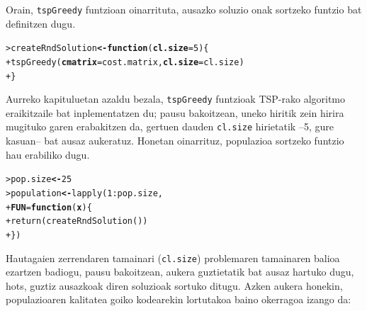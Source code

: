 \documentclass[eu]{ifirak}\usepackage[]{graphicx}\usepackage[]{color}
\makeatletter
\newcommand{\hlnum}[1]{\textcolor[rgb]{0.659,0.4,0.051}{#1}}%
\newcommand{\hlopt}[1]{\textcolor[rgb]{0,0,0}{#1}}%
\newcommand{\hlstd}[1]{\textcolor[rgb]{0,0,0}{#1}}%
\newcommand{\hlkwa}[1]{\textcolor[rgb]{0.133,0.224,0.659}{\textbf{#1}}}%
\newcommand{\hlkwb}[1]{\textcolor[rgb]{0.549,0.114,0.412}{\textbf{#1}}}%
\newcommand{\hlkwc}[1]{\textcolor[rgb]{0.659,0.573,0.133}{\textbf{#1}}}%
\newcommand{\hlkwd}[1]{\textcolor[rgb]{0.659,0.133,0.482}{#1}}%
\newenvironment{kframe}{%
 \def\at@end@of@kframe{}%
 \ifinner\ifhmode%
  \def\at@end@of@kframe{\end{minipage}}%
  \begin{minipage}{\columnwidth}%
 \fi\fi%
 \def\FrameCommand##1{\hskip\@totalleftmargin \hskip-\fboxsep
 \colorbox{shadecolor}{##1}\hskip-\fboxsep
     \hskip-\linewidth \hskip-\@totalleftmargin \hskip\columnwidth}%
 \MakeFramed {\advance\hsize-\width
   \@totalleftmargin\z@ \linewidth\hsize
   \@setminipage}}%
 {\par\unskip\endMakeFramed%
 \at@end@of@kframe}
\newenvironment{knitrout}{}{} %
\newcommand{\code}[1]{\texttt{#1}}
\makeatother
\begin{document}
Orain, \code{tspGreedy} funtzioan oinarrituta, ausazko soluzio onak sortzeko funtzio bat definitzen dugu.

\begin{knitrout}
\color{fgcolor}\begin{kframe}
\begin{alltt}
\hlstd{> }\hlstd{createRndSolution} \hlkwb{<-} \hlkwa{function}\hlstd{(}\hlkwc{cl.size}\hlstd{=}\hlnum{5}\hlstd{) \{}
\hlstd{+ }  \hlkwd{tspGreedy}\hlstd{(}\hlkwc{cmatrix}\hlstd{=cost.matrix,} \hlkwc{cl.size}\hlstd{=cl.size)}
\hlstd{+ }\hlstd{\}}
\end{alltt}
\end{kframe}
\end{knitrout}

Aurreko kapituluetan azaldu bezala, \code{tspGreedy} funtzioak TSP-rako algoritmo eraikitzaile bat inplementatzen du; pausu bakoitzean, uneko hiritik zein hirira mugituko garen erabakitzen da, gertuen dauden \code{cl.size} hirietatik --5, gure kasuan-- bat ausaz aukeratuz. Honetan oinarrituz, populazioa sortzeko funtzio hau erabiliko dugu.

\begin{knitrout}
\color{fgcolor}\begin{kframe}
\begin{alltt}
\hlstd{> }\hlstd{pop.size} \hlkwb{<-} \hlnum{25}
\hlstd{> }\hlstd{population} \hlkwb{<-} \hlkwd{lapply}\hlstd{(}\hlnum{1}\hlopt{:}\hlstd{pop.size,}
\hlstd{+ }                     \hlkwc{FUN}\hlstd{=}\hlkwa{function}\hlstd{(}\hlkwc{x}\hlstd{) \{}
\hlstd{+ }                       \hlkwd{return}\hlstd{(}\hlkwd{createRndSolution}\hlstd{())}
\hlstd{+ }                     \hlstd{\})}
\end{alltt}
\end{kframe}
\end{knitrout}

Hautagaien zerrendaren tamainari (\code{cl.size}) problemaren tamainaren balioa ezartzen badiogu, pausu bakoitzean, aukera guztietatik bat ausaz hartuko dugu, hots, guztiz ausazkoak diren soluzioak sortuko ditugu. Azken aukera honekin, populazioaren kalitatea goiko kodearekin lortutakoa baino okerragoa izango da:
\end{document}
